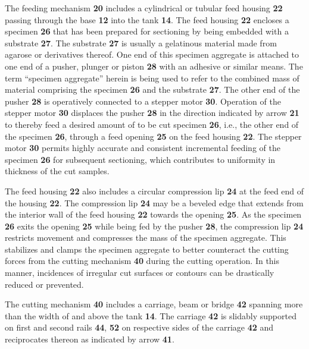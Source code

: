 \documentclass{article}
\begin{document}
The feeding mechanism \textbf{20} includes a cylindrical or tubular feed housing \textbf{22} passing through the base \textbf{12} into the tank \textbf{14}. The feed housing \textbf{22} encloses a specimen \textbf{26} that has been prepared for sectioning by being embedded with a substrate \textbf{27}. The substrate \textbf{27} is usually a gelatinous material made from agarose or derivatives thereof. One end of this specimen aggregate is attached to one end of a pusher, plunger or piston \textbf{28} with an adhesive or similar means. The term ``specimen aggregate'' herein is being used to refer to the combined mass of material comprising the specimen \textbf{26} and the substrate \textbf{27}. The other end of the pusher \textbf{28} is operatively connected to a stepper motor \textbf{30}. Operation of the stepper motor \textbf{30} displaces the pusher \textbf{28} in the direction indicated by arrow \textbf{21} to thereby feed a desired amount of to be cut specimen \textbf{26}, i.e., the other end of the specimen \textbf{26}, through a feed opening \textbf{25} on the feed housing \textbf{22}. The stepper motor \textbf{30} permits highly accurate and consistent incremental feeding of the specimen \textbf{26} for subsequent sectioning, which contributes to uniformity in thickness of the cut samples.

The feed housing \textbf{22} also includes a circular compression lip \textbf{24} at the feed end of the housing \textbf{22}. The compression lip \textbf{24} may be a beveled edge that extends from the interior wall of the feed housing \textbf{22} towards the opening \textbf{25}. As the specimen \textbf{26} exits the opening \textbf{25} while being fed by the pusher \textbf{28}, the compression lip \textbf{24} restricts movement and compresses the mass of the specimen aggregate. This stabilizes and clamps the specimen aggregate to better counteract the cutting forces from the cutting mechanism \textbf{40} during the cutting operation. In this manner, incidences of irregular cut surfaces or contours can be drastically reduced or prevented.

The cutting mechanism \textbf{40} includes a carriage, beam or bridge \textbf{42} spanning more than the width of and above the tank \textbf{14}. The carriage \textbf{42} is slidably supported on first and second rails \textbf{44}, \textbf{52} on respective sides of the carriage \textbf{42} and reciprocates thereon as indicated by arrow \textbf{41}.
\end{document}

